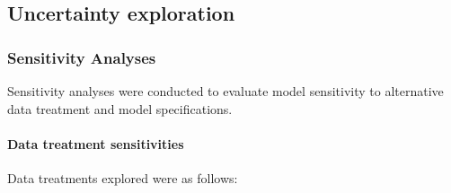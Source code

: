 \documentclass[11pt,
  english,
  a4paper,
]{article}
\begin{document}
\leavevmode\tagmcend\tagstructend\par


\hypertarget{uncertainty-exploration}{%
\subsection{Uncertainty exploration}\label{uncertainty-exploration}}

\leavevmode\tagmcend\tagstructend


\hypertarget{sensitivity-analyses}{%
\subsubsection{Sensitivity Analyses}\label{sensitivity-analyses}}

\leavevmode\tagmcend\tagstructend


Sensitivity analyses were conducted to evaluate model sensitivity to alternative data treatment and model specifications.

\leavevmode\tagmcend\tagstructend\par


\hypertarget{data-treatment-sensitivities}{%
\paragraph{Data treatment sensitivities}\label{data-treatment-sensitivities}}

\leavevmode\tagmcend\tagstructend


Data treatments explored were as follows:

\leavevmode\tagmcend\tagstructend\par

\end{document}
